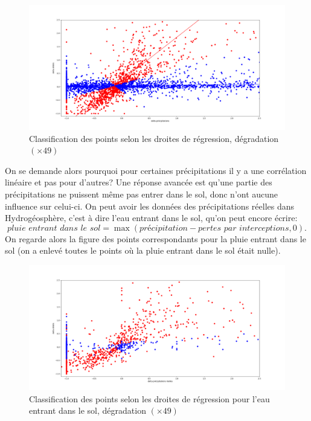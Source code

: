 \documentclass[a4paper,11pt]{article}
\numberwithin{equation}{section}
\begin{document}
\begin{figure}[H]
	\label{fig-deb prec 3 classification}
	\begin{center}
		\includegraphics[scale=0.33]{classification_deb_pr.png}
	\end{center}
	\caption{Classification des points selon les droites de régression, dégradation $(\times 49)$}
\end{figure}

On se demande alors pourquoi pour certaines précipitations il y a une corrélation linéaire et pas pour d'autres? Une réponse avancée est qu'une partie des précipitations ne puissent même pas entrer dans le sol, donc n'ont aucune influence sur celui-ci. On peut avoir les données des précipitations réelles dans Hydrogéosphère, c'est à dire l'eau entrant dans le sol, qu'on peut encore écrire:
\[\textit{pluie entrant dans le sol}=\max(\textit{précipitation}-\textit{pertes par interceptions},0).\]
On regarde alors la figure des points correspondants pour la pluie entrant dans le sol (on a enlevé toutes le points où la pluie entrant dans le sol était nulle).

\begin{figure}[H]
	\label{fig-deb prr 3 classification}
	\begin{center}
		\includegraphics[scale=0.33]{classification_deb_prr.png}
	\end{center}
	\caption{Classification des points selon les droites de régression pour l'eau entrant dans le sol, dégradation $(\times 49)$}
\end{figure}
\end{document}
